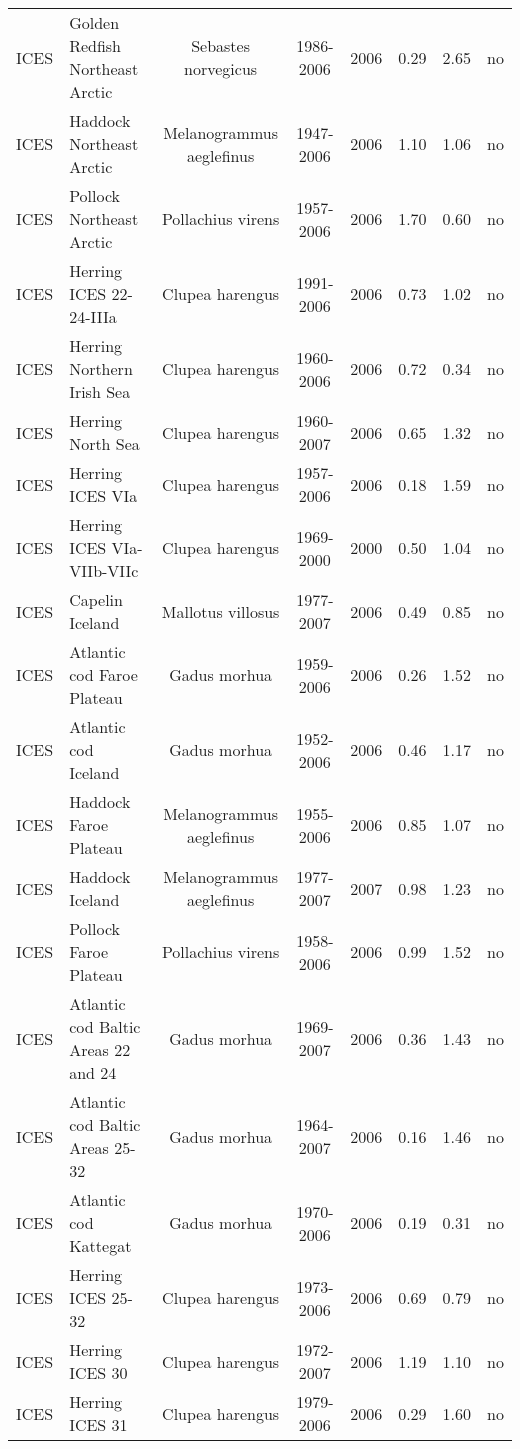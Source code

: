 \begin{longtable}{p{6cm}p{3cm}cccccc}
  ICES & Golden Redfish Northeast Arctic & Sebastes norvegicus & 1986-2006 & 2006 & 0.29 & 2.65 & no \\
  ICES & Haddock Northeast Arctic & Melanogrammus aeglefinus & 1947-2006 & 2006 & 1.10 & 1.06 & no \\
  ICES & Pollock Northeast Arctic & Pollachius virens & 1957-2006 & 2006 & 1.70 & 0.60 & no \\
  ICES & Herring ICES 22-24-IIIa & Clupea harengus & 1991-2006 & 2006 & 0.73 & 1.02 & no \\
  ICES & Herring Northern Irish Sea & Clupea harengus & 1960-2006 & 2006 & 0.72 & 0.34 & no \\
  ICES & Herring North Sea & Clupea harengus & 1960-2007 & 2006 & 0.65 & 1.32 & no \\
  ICES & Herring ICES VIa & Clupea harengus & 1957-2006 & 2006 & 0.18 & 1.59 & no \\
  ICES & Herring ICES VIa-VIIb-VIIc & Clupea harengus & 1969-2000 & 2000 & 0.50 & 1.04 & no \\
  ICES & Capelin Iceland & Mallotus villosus & 1977-2007 & 2006 & 0.49 & 0.85 & no \\
  ICES & Atlantic cod Faroe Plateau & Gadus morhua & 1959-2006 & 2006 & 0.26 & 1.52 & no \\
  ICES & Atlantic cod Iceland & Gadus morhua & 1952-2006 & 2006 & 0.46 & 1.17 & no \\
  ICES & Haddock Faroe Plateau & Melanogrammus aeglefinus & 1955-2006 & 2006 & 0.85 & 1.07 & no \\
  ICES & Haddock Iceland & Melanogrammus aeglefinus & 1977-2007 & 2007 & 0.98 & 1.23 & no \\
  ICES & Pollock Faroe Plateau & Pollachius virens & 1958-2006 & 2006 & 0.99 & 1.52 & no \\
  ICES & Atlantic cod Baltic Areas 22 and 24 & Gadus morhua & 1969-2007 & 2006 & 0.36 & 1.43 & no \\
  ICES & Atlantic cod Baltic Areas 25-32 & Gadus morhua & 1964-2007 & 2006 & 0.16 & 1.46 & no \\
  ICES & Atlantic cod Kattegat & Gadus morhua & 1970-2006 & 2006 & 0.19 & 0.31 & no \\
  ICES & Herring ICES 25-32 & Clupea harengus & 1973-2006 & 2006 & 0.69 & 0.79 & no \\
  ICES & Herring ICES 30 & Clupea harengus & 1972-2007 & 2006 & 1.19 & 1.10 & no \\
  ICES & Herring ICES 31 & Clupea harengus & 1979-2006 & 2006 & 0.29 & 1.60 & no \\

\end{longtable}

